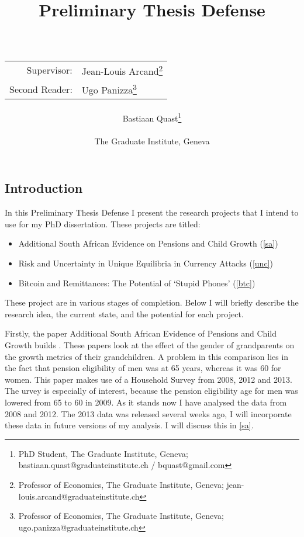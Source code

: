 \documentclass[a4paper]{report}
\title{Preliminary Thesis Defense\\~\\
\begin{tabular}{rl}
Supervisor:&Jean-Louis Arcand\footnote{Professor of Economics, The Graduate Institute, Geneva; jean-louis.arcand@graduateinstitute.ch}\\
Second Reader:&Ugo Panizza\footnote{Professor of Economics, The Graduate Institute, Geneva; ugo.panizza@graduateinstitute.ch}
\end{tabular}
}
\author{Bastiaan Quast\thanks{PhD Student, The Graduate Institute, Geneva; bastiaan.quast@graduateinstitute.ch / bquast@gmail.com}\\~\\
The Graduate Institute, Geneva}
\begin{document}
\maketitle
\tableofcontents

\begin{refsection}
\chapter{Introduction}
\label{intro}
In this Preliminary Thesis Defense I present the research projects that I intend to use for my PhD dissertation. These projects are titled:

\begin{itemize}
\item Additional South African Evidence on Pensions and Child Growth (\autoref{sa})
\item Risk and Uncertainty in Unique Equilibria in Currency Attacks (\autoref{unc})
\item Bitcoin and Remittances: The Potential of `Stupid Phones' (\autoref{btc})
\end{itemize}

These project are in various stages of completion.
Below I will briefly describe the research idea, the current state, and the potential for each project.

Firstly, the paper Additional South African Evidence of Pensions and Child Growth builds \textcite{duflo2000child, duflo2003grandmothers}.
These papers look at the effect of the gender of grandparents on the growth metrics of their grandchildren.
A problem in this comparison lies in the fact that pension eligibility of men was at 65 years, whereas it was 60 for women.
This paper makes use of a Household Survey from 2008, 2012 and 2013. The 
urvey is especially of interest, because the pension eligibility age for men was lowered from 65 to 60 in 2009.
As it stands now I have analysed the data from 2008 and 2012.
The 2013 data was released several weeks ago, I will incorporate these data in future versions of my analysis.
I will discuss this in \autoref{sa}.



\end{refsection}
\end{document}
